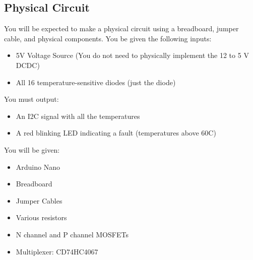 \documentclass{article}
\begin{document}
    \subsection*{Physical Circuit}
    You will be expected to make a physical circuit using a breadboard, jumper cable, and physical components. You be given the following inputs: 
    \begin{itemize}
        \item 5V Voltage Source (You do not need to physically implement the 12 to 5 V DCDC) 
        \item All 16 temperature-sensitive diodes (just the diode)
    \end{itemize}
    You must output: 
    \begin{itemize}
        \item An I2C signal with all the temperatures 
        \item A red blinking LED indicating a fault (temperatures above 60C)
    \end{itemize}
    You will be given: 
    \begin{itemize}
        \item Arduino Nano 
        \item Breadboard 
        \item Jumper Cables 
        \item Various resistors 
        \item N channel and P channel MOSFETs
        \item Multiplexer: CD74HC4067
    \end{itemize}
\end{document}
